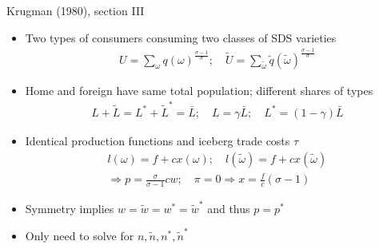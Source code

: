 \documentclass[11pt,notes=hide,aspectratio=169]{beamer}
\begin{document}
\begin{frame}{Krugman (1980), section III}
\begin{itemize}
	\item Two types of consumers consuming two classes of SDS varieties
	\begin{align*}U = \sum_{\omega} q(\omega)^{\frac{\sigma-1}{\sigma}} ; \quad \tilde{U} = \sum_{\tilde{\omega}} \tilde{q}(\tilde{\omega})^{\frac{\sigma-1}{\sigma}} \end{align*}
	\item Home and foreign have same total population; different shares of types
	\begin{align*}L + \tilde{L} = L^* + \tilde{L}^{*} = \bar{L} ; \quad L = \gamma \bar{L} ; \quad L^* = (1-\gamma)\bar{L}  \end{align*}
	\item Identical production functions and iceberg trade costs $\tau$
	\begin{align*} l(\omega) = f + c x(\omega) ; \quad l(\tilde{\omega}) = f + c x(\tilde{\omega}) \\
	\Rightarrow p = \frac{\sigma}{\sigma-1} c w ; \quad \pi=0\Rightarrow x = \frac{f}{c}\left(\sigma-1\right)
	\end{align*}
	\item Symmetry implies $w = \tilde{w} = w^* = \tilde{w}^*$ and thus $p=p^*$
	\item Only need to solve for $n, \tilde{n}, n^*, \tilde{n}^{*}$
\end{itemize}
\end{frame}
\end{document}
